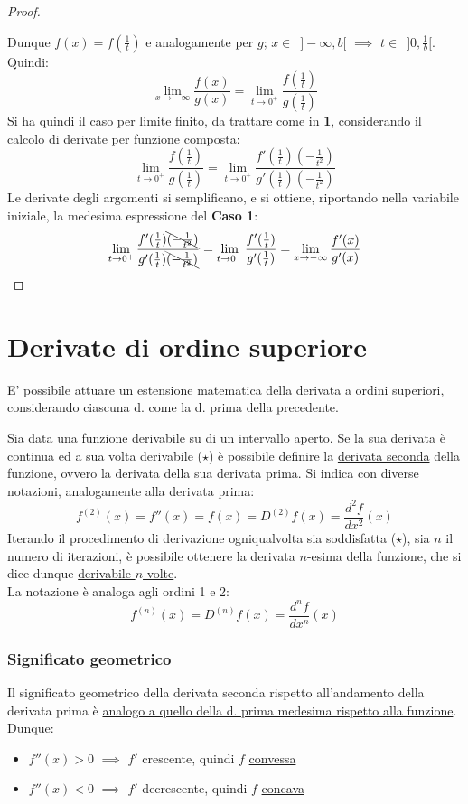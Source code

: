 \documentclass[10pt, oneside]{book}
\theoremstyle{plain}
\begin{document}
\begin{proof}
\begin{itemize}[label=$\circ$]
\end{itemize}
Dunque $f(x) = f(\frac{1}{t})$ e analogamente per $g$; $x \in \enspace ]- \infty, b[$ $\implies$ $t \in \enspace ]0, \frac{1}{b}[$. Quindi:
\[\lim \limits_{x \rightarrow - \infty} \frac{f(x)}{g(x)} = \lim \limits_{t \rightarrow 0^+} \frac{f(\frac{1}{t})}{g(\frac{1}{t})}\]
Si ha quindi il caso per limite finito, da trattare come in \textbf{1}, considerando il calcolo di derivate per funzione composta:
\[\lim \limits_{t \rightarrow 0^+} \frac{f(\frac{1}{t})}{g(\frac{1}{t})} = \lim \limits_{t \rightarrow 0^+} \frac{f'(\frac{1}{t}) (-\frac{1}{t^2})}{g'(\frac{1}{t}) (-\frac{1}{t^2})}\]
Le derivate degli argomenti si semplificano, e si ottiene, riportando nella variabile iniziale, la medesima espressione del \textbf{Caso 1}:
\[\lim \limits_{t \rightarrow 0^+} \frac{f'(\frac{1}{t}) \bcancel{(-\frac{1}{t^2})}}{g'(\frac{1}{t}) \bcancel{(-\frac{1}{t^2})}} = \lim \limits_{t \rightarrow 0^+} \frac{f'(\frac{1}{t})}{g'(\frac{1}{t})} = \lim \limits_{x \rightarrow - \infty} \frac{f'(x)}{g'(x)}\]
\end{proof}

\chapter{Derivate di ordine superiore}
E' possibile attuare un estensione matematica della derivata a ordini superiori, considerando ciascuna d. come la d. prima della precedente.
\begin{defin}
Sia data una funzione derivabile su di un intervallo aperto. Se la sua derivata è continua ed a sua volta derivabile ($\star$) è possibile definire la \underline{derivata seconda} della funzione, ovvero la derivata della sua derivata prima. 
Si indica con diverse notazioni, analogamente alla derivata prima:
\[f^{(2)}(x) = f''(x) = \dddot{f}(x) = D^{(2)}f(x) = \frac{d^2 f}{d x^2}(x)\]
Iterando il procedimento di derivazione ogniqualvolta sia soddisfatta ($\star$), sia $n$ il numero di iterazioni, è possibile ottenere la derivata $n$-esima della funzione, che si dice dunque \underline{derivabile $n$ volte}.\\
La notazione è analoga agli ordini 1 e 2:
\[f^{(n)}(x) = D^{(n)}f(x) = \frac{d^n f}{d x^n}(x)\]
\end{defin}

\subsection{Significato geometrico}
Il significato geometrico della derivata seconda rispetto all'andamento della derivata prima è \hyperlink{corlagrange}{analogo a quello della d. prima medesima rispetto alla funzione}. Dunque:
\begin{itemize}[label=$\square$]
    \item $f''(x) > 0$ $\implies$ $f'$ crescente, quindi $f$ \underline{convessa}
     \item $f''(x) < 0$ $\implies$ $f'$ decrescente, quindi $f$ \underline{concava}
\end{itemize}
\end{document}
